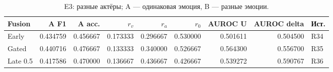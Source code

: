 \begin{table}[H]\centering\scriptsize
\setlength{\tabcolsep}{4pt}
\caption{E3: разные актёры; A --- одинаковая эмоция, B --- разные эмоции.}\label{tab:conflict}
\begin{tabular}{lrrrrrrrl}
\toprule
Fusion & A F1 & A acc. & $r_v$ & $r_a$ & $r_0$ & AUROC U & AUROC delta & Ист. \\
\midrule
Early & 0.434759 & 0.456667 & 0.173333 & 0.296667 & 0.530000 & 0.501611 & 0.504500 & R34 \\
Gated & 0.440716 & 0.476667 & 0.133333 & 0.340000 & 0.526667 & 0.564300 & 0.556700 & R35 \\
Late 0.5 & 0.417586 & 0.470000 & 0.136667 & 0.436667 & 0.426667 & 0.539272 & 0.590767 & R36 \\
\bottomrule
\end{tabular}
\end{table}
